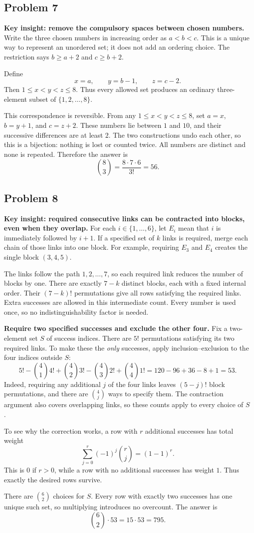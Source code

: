\documentclass[12pt]{article}
\newcommand{\solution}[1]{\par\Needspace{8\baselineskip}\subsection*{Problem #1}}
\begin{document}
\clearpage
\solution{7}
\textbf{Key insight: remove the compulsory spaces between chosen numbers.}
Write the three chosen numbers in increasing order as $a<b<c$.
This is a unique way to represent an unordered set; it does not add
an ordering choice. The restriction says $b\geq a+2$ and $c\geq b+2$.

Define
\[
x=a,\qquad y=b-1,\qquad z=c-2.
\]
Then $1\leq x<y<z\leq8$. Thus every allowed set produces an ordinary
three-element subset of $\{1,2,\ldots,8\}$.

This correspondence is reversible. From any $1\leq x<y<z\leq8$,
set $a=x$, $b=y+1$, and $c=z+2$. These numbers lie between $1$ and $10$,
and their successive differences are at least $2$. The two constructions
undo each other, so this is a bijection: nothing is lost or counted twice.
All numbers are distinct and none is repeated. Therefore the answer is
\[
\binom83=\frac{8\cdot7\cdot6}{3!}=\boxed{56}.
\]

\clearpage
\solution{8}
\textbf{Key insight: required consecutive links can be contracted into blocks,
even when they overlap.}
For each $i\in\{1,\ldots,6\}$, let $E_i$ mean that $i$ is immediately
followed by $i+1$. If a specified set of $k$ links is required, merge
each chain of those links into one block. For example, requiring $E_3$
and $E_4$ creates the single block $(3,4,5)$.

The links follow the path $1,2,\ldots,7$, so each required link reduces
the number of blocks by one. There are exactly $7-k$ distinct blocks,
each with a fixed internal order. Their $(7-k)!$ permutations give all
rows satisfying the required links. Extra successes are allowed in this
intermediate count. Every number is used once, so no indistinguishability
factor is needed.

\textbf{Require two specified successes and exclude the other four.}
Fix a two-element set $S$ of success indices. There are $5!$ permutations
satisfying its two required links. To make these the \emph{only} successes,
apply inclusion--exclusion to the four indices outside $S$:
\[
5!-\binom41 4!+\binom42 3!-\binom43 2!+\binom44 1!
=120-96+36-8+1=53.
\]
Indeed, requiring any additional $j$ of the four links leaves
$(5-j)!$ block permutations, and there are $\binom4j$ ways to specify them.
The contraction argument also covers overlapping links, so these counts
apply to every choice of $S$.

To see why the correction works, a row with $r$ additional successes
has total weight
\[
\sum_{j=0}^{r}(-1)^j\binom rj=(1-1)^r.
\]
This is $0$ if $r>0$, while a row with no additional successes has weight
$1$. Thus exactly the desired rows survive.

There are $\binom62$ choices for $S$. Every row with exactly two successes
has one unique such set, so multiplying introduces no overcount. The answer is
\[
\binom62\cdot53=15\cdot53=\boxed{795}.
\]
\end{document}
